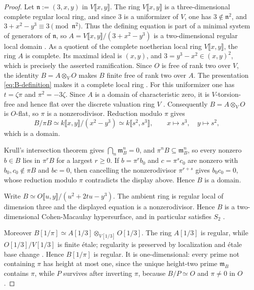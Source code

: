 \documentclass[10pt]{amsart}
\theoremstyle{remark}
\begin{document}
\begin{proof}
	Let	$\mathfrak n:=(3,x,y)$ in $V\llbracket x,y\rrbracket$.  The ring $V\llbracket x,y\rrbracket$ is a three-dimensional complete
	regular local ring, and
	since \(3\) is a uniformizer of \(V\), one has
	\(3\notin\mathfrak n^2\), and
	$3+x^2-y^3\equiv3\pmod{\mathfrak n^2}$.  Thus the defining equation is
	part of a minimal system of generators of $\mathfrak n$, so
	\(A=V\llbracket x,y\rrbracket/(3+x^2-y^3)\) is a two-dimensional regular local domain
	\cite[Tags~032C, 00NQ and~00NP]{StacksProject}.  As a quotient of the complete
	noetherian local ring \(V\llbracket x,y\rrbracket\), the ring \(A\) is complete.  Its maximal
	ideal is \((x,y)\),
	and $3=y^3-x^2\in(x,y)^2$, which is precisely the asserted ramification.
	Since $O$ is free of rank two over $V$, the identity
	$B=A\otimes_VO$ makes $B$ finite free of rank two over $A$.  The
	presentation \eqref{eq:B-definition} makes it a complete local ring
	\cite[Tag~0325]{StacksProject}.
	For this uniformizer one has \(t=\zeta\pi\) and
	\(\pi^2=-3\zeta\). Since $A$ is a domain of characteristic zero, it is
	$V$-torsion-free and hence flat over the discrete valuation ring $V$
	\cite[Tag~0539]{StacksProject}.  Consequently $B=A\otimes_VO$ is
	$O$-flat, so $\pi$ is a nonzerodivisor.  Reduction modulo $\pi$ gives
	\[
	B/\pi B\simeq k\llbracket x,y\rrbracket/(x^2-y^3)
	\simeq k\llbracket s^2,s^3\rrbracket,
	\qquad x\longmapsto s^3,\quad y\longmapsto s^2,
	\]
	which is a domain.  
	
	Krull's intersection theorem gives \(\bigcap_n\mathfrak m_B^n=0\), and
	\(\pi^nB\subseteq\mathfrak m_B^n\), so every nonzero \(b\in B\) lies in
	\(\pi^rB\) for a largest \(r\ge0\).  If \(b=\pi^rb_0\) and
	\(c=\pi^sc_0\) are nonzero with \(b_0,c_0\notin\pi B\) and \(bc=0\), then
	cancelling the nonzerodivisor \(\pi^{r+s}\) gives \(b_0c_0=0\), whose
	reduction modulo \(\pi\) contradicts the display above.  Hence \(B\) is a
	domain.
	
	
	
	Write
	\(
	B\simeq O\llbracket u,y\rrbracket/(u^2+2tu-y^3).
	\)
	The ambient ring is regular local of dimension three and the displayed
	equation is a nonzerodivisor.  Hence $B$ is a two-dimensional
	Cohen-Macaulay hypersurface, and in particular satisfies $S_2$
	\cite[Tags~00NQ, 02JN and~0342]{StacksProject}.  
	
	
	Moreover
	\(B[1/\pi]\simeq
	A[1/3]\otimes_{V[1/3]}O[1/3]\).
	The ring \(A[1/3]\) is regular, while
	\(O[1/3]/V[1/3]\) is finite \'etale; regularity is preserved by
	localization and \'etale base change
	\cite[Tags~0AFS and~0AH0]{StacksProject}.  Hence \(B[1/\pi]\) is
	regular.  It is one-dimensional: every prime not containing \(\pi\)
	has height at most one, since the unique height-two prime
	\(\mathfrak m_B\) contains \(\pi\), while \(P\) survives after inverting
	\(\pi\), because \(B/P\simeq O\) and \(\pi\ne0\) in \(O\).
	

\end{proof}
\end{document}
